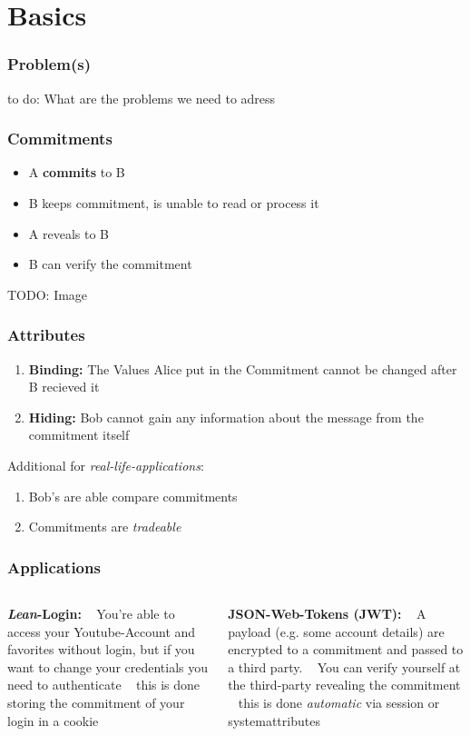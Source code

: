 \section{Basics}

\begin{frame}
	\frametitle{Problem(s)}
	to do: What are the problems we need to adress
\end{frame}

\begin{frame}
	\frametitle{Commitments}
	\begin{itemize}
		\item A \textbf{commits} to B
		\item B keeps commitment, is unable to read or process it
		\item A reveals to B
		\item B can verify the commitment 
	\end{itemize}
TODO: Image
\end{frame}

\begin{frame}
	\frametitle{Attributes}
	\begin{enumerate}
		\item \textbf{Binding:} The Values Alice put in the Commitment cannot be changed after B recieved it 
		\item \textbf{Hiding:} Bob cannot gain any information about the message from the commitment itself
	\end{enumerate}
	Additional for \textit{real-life-applications}:
	\begin{enumerate}
		\item Bob's are able compare commitments
		\item Commitments are \textit{tradeable}
	\end{enumerate}
\end{frame}

\begin{frame}
	\frametitle{Applications}
	\begin{columns}
		\begin{column}{0.5\textwidth}
			\textbf{\textit{Lean}-Login:} ~\newline
			You're able to access your Youtube-Account and favorites without login, but if you want to change your credentials you need to authenticate
			~\newline 
			this is done storing the commitment of your login in a cookie 
		\end{column}
		\begin{column}{0.5\textwidth}
			\textbf{JSON-Web-Tokens (JWT):} ~\newline
			A payload (e.g. some account details) are encrypted to a commitment and passed to a third party. ~\newline 
			You can verify yourself at the third-party revealing the commitment ~\newline 
			this is done \textit{automatic} via session or systemattributes 
		\end{column}
	\end{columns}
\end{frame}